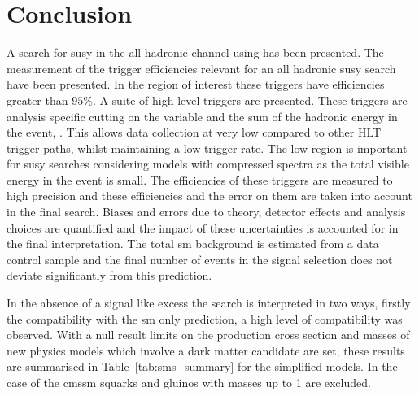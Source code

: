 \chapter{Conclusion} %
\label{cha:conclusion}
A search for \ac{susy} in the all hadronic channel using \alt has been 
presented. The measurement of the \Lone trigger efficiencies relevant for an all hadronic \ac{susy} search have been presented. In the region of interest these triggers have efficiencies greater than $95\%$. A suite of high level triggers are presented. These triggers are analysis specific cutting on the \alt variable and the sum of the hadronic energy in the event, \HT. This allows data collection at very low \HT compared to other HLT trigger paths, whilst maintaining a low trigger rate. The low \HT region is important for \ac{susy} searches considering models with compressed spectra as the total visible energy in the event is small. The efficiencies of these triggers are measured to high precision and these efficiencies and the error on them are taken into account in the final search. Biases and errors due to theory, detector effects and analysis choices are quantified and the impact of these uncertainties is accounted for in the final interpretation.
The total \ac{sm} background is estimated from a data control sample and the 
final number of events in the signal selection does not deviate significantly 
from this prediction.



In the absence of a signal like excess the search is interpreted in two ways, 
firstly the compatibility with the \ac{sm} only prediction, a high level of 
compatibility was observed. With a null result limits on the production cross 
section and masses of new physics models which involve a dark matter candidate 
are set, these results are summarised in Table~\ref{tab:sms_summary} for the 
simplified models. In the case of the \ac{cmssm} squarks and gluinos with 
masses up to \unit{1}{\TeV} are excluded.


